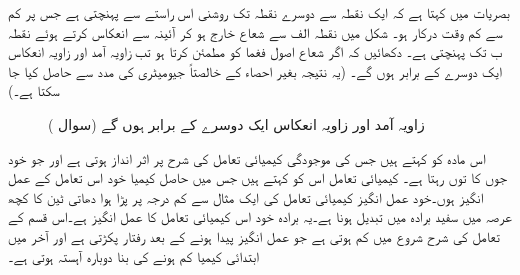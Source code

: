 بصریات میں  کہتا ہے کہ ایک نقطہ سے دوسرے نقطہ تک  روشنی اس راستے سے پہنچتی ہے جس پر کم سے کم وقت درکار ہو۔ شکل  میں نقطہ الف سے شعاع خارج ہو کر  آئینہ سے انعکاس کرتے ہوئے نقطہ ب تک پہنچتی ہے۔ دکھائیں کہ اگر شعاع اصول فغما کو مطمئن کرتا ہو تب زاویہ آمد اور زاویہ انعکاس ایک دوسرے کے برابر ہوں گے۔ (یہ نتیجہ بغیر احصاء کے خالصتاً جیومیٹری کی مدد سے حاصل کیا جا سکتا ہے۔)
\begin{figure}
\centering
{}
\caption{زاویہ آمد اور زاویہ انعکاس ایک دوسرے کے برابر ہوں گے (سوال )}
\label{شکل_سوال_استعمال_زاویہ_آمد_اور_انعکاس}
\end{figure}
%
\quad
{} اس مادہ کو کہتے ہیں جس کی موجودگی کیمیائی تعامل کی شرح پر اثر انداز ہوتی ہے اور جو خود جوں کا توں رہتا ہے۔  کیمیائی تعامل اس کو کہتے ہیں جس میں حاصل کیمیا خود اس تعامل کے عمل انگیز ہوں۔خود عمل انگیز کیمیائی تعامل کی ایک مثال   سے کم درجہ پر پڑا ہوا دھاتی ٹین کا کچھ عرصہ میں سفید برادہ میں تبدیل ہونا ہے۔یہ برادہ خود اس کیمیائی تعامل کا عمل انگیز ہے۔اس  قسم کے تعامل کی شرح شروع میں کم ہوتی ہے جو عمل انگیز پیدا ہونے کے بعد رفتار پکڑتی ہے اور آخر میں ابتدائی کیمیا کم ہونے کی بنا دوبارہ آہستہ ہوتی ہے۔
 
